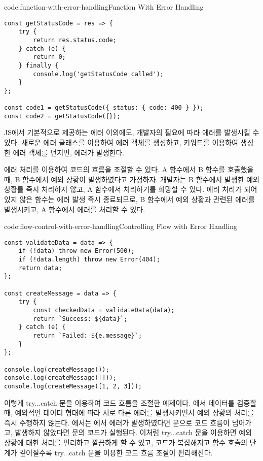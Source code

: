 \begin{codeenv}{code:function-with-error-handling}{Function With Error Handling}\begin{verbatim}
const getStatusCode = res => {
    try {
        return res.status.code;
    } catch (e) {
        return 0;
    } finally {
        console.log('getStatusCode called');
    }
};

const code1 = getStatusCode({ status: { code: 400 } });
const code2 = getStatusCode({});
\end{verbatim}
\end{codeenv}

JS에서 기본적으로 제공하는 에러 이외에도, 개발자의 필요에 따라 에러를 발생시킬 수 있다. 새로운 에러 클래스를 이용하여 에러 객체를 생성하고,  키워드를 이용하여 생성한 에러 객체를 던지면, 에러가 발생한다.

에러 처리를 이용하여 코드의 흐름을 조절할 수 있다. A 함수에서 B 함수를 호출했을 때, B 함수에서 예외 상황이 발생하였다고 가정하자. 개발자는 B 함수에서 발생한 예외 상황를 즉시 처리하지 않고, A 함수에서 처리하기를 희망할 수 있다. 에러 처리가 되어있지 않은 함수는 에러 발생 즉시 종료되므로, B 함수에서 예외 상황과 관련된 에러를 발생시키고, A 함수에서 에러를 처리할 수 있다.

\begin{codeenv}{code:flow-control-with-error-handling}{Controlling Flow with Error Handling}\begin{verbatim}
const validateData = data => {
    if (!data) throw new Error(500);
    if (!data.length) throw new Error(404);
    return data;
};

const createMessage = data => {
    try {
        const checkedData = validateData(data);
        return `Success: ${data}`;
    } catch (e) {
        return `Failed: ${e.message}`;
    }
};

console.log(createMessage());
console.log(createMessage([]));
console.log(createMessage([1, 2, 3]));
\end{verbatim}
\end{codeenv}

\은 이렇게 try...catch 문을 이용하여 코드 흐름을 조절한 예제이다. 에서 데이터를 검증할 때, 예외적인 데이터 형태에 따라 서로 다른 에러를 발생시키면서 예외 상황의 처리를 즉시 수행하지 않는다. 에서는 에서 에러가 발생하였다면  문으로 코드 흐름이 넘어가고, 발생하지 않았다면  문의 코드가 실행된다. 이처럼 try...catch 문을 이용하면 예외 상황에 대한 처리를 편리하고 깔끔하게 할 수 있고, 코드가 복잡해지고 함수 호출의 단계가 깊어질수록 try...catch 문을 이용한 코드 흐름 조절이 편리해진다.
